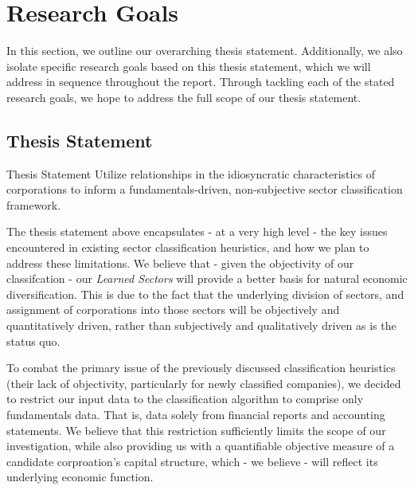 \documentclass[../main.tex]{subfiles}
\begin{document}
    
\chapter{Research Goals}
    
In this section, we outline our overarching thesis statement. Additionally, we also isolate specific research goals based on this thesis statement, which we will address in sequence throughout the report. Through tackling each of the stated research goals, we hope to address the full scope of our thesis statement.

\section{Thesis Statement} \label{research_goals:thesis_statement}

\begin{center}
    \begin{minipage}{0.7\textwidth}
        \begin{bclogo}[couleur=blue!30, arrondi=0.1, logo=\bcloupe, ombre=false]{\;Thesis Statement}
            Utilize relationships in the idiosyncratic characteristics of corporations to inform a fundamentals-driven, non-subjective sector classification framework.
        \end{bclogo}
    \end{minipage}
\end{center}

\vspace{1em}

The thesis statement above encapsulates - at a very high level - the key issues encountered in existing sector classification heuristics, and how we plan to address these limitations. We believe that - given the objectivity of our classifcation - our \textit{Learned Sectors} will provide a better basis for natural economic diversification. This is due to the fact that the underlying division of sectors, and assignment of corporations into those sectors will be objectively and quantitatively driven, rather than subjectively and qualitatively driven as is the status quo.

To combat the primary issue of the previously discussed classification heuristics (their lack of objectivity, particularly for newly classified companies), we decided to restrict our input data to the classification algorithm to comprise only fundamentals data. That is, data solely from financial reports and accounting statements. We believe that this restriction sufficiently limits the scope of our investigation, while also providing us with a quantifiable objective measure of a candidate corproation's capital structure, which - we believe - will reflect its underlying economic function.
\end{document}

